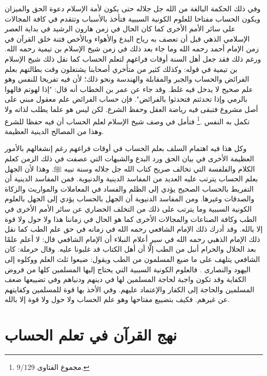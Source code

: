 وفي ذلك الحكمة البالغة من الله جل جلاله حتى يكون لأمة الإسلام دعوة الحق والميزان ويكون الحساب مفتاحا للعلوم الكونية السببية فتأخذ بالأسباب وتتقدم في كافة المجالات على سائر الأمم الأخرى كما كان الحال في زمن هارون الرشيد في بداية العصر الإسلامي الذهي قبل أن تعصف به رياح البدع والأهواء وبالأخص فتنة خلق القرآن في زمن الإمام أحمد رحمه الله وما جاء بعد ذلك في زمن شيخ الإسلام بن تيمية رحمه الله. ورغم ذلك فقد جعل أهل السنة أوقات فراغهم لتعلم الحساب كما نقل ذلك شيخ الإسلام بن تيمية في قوله: وكذلك كثير من متأخري أصحابنا يشتغلون وقت بطالتهم بعلم الفرائض والحساب والجبر والمقابلة والهندسة ونحو ذلك؛ لأن فيه تفريحا للنفس وهو علم صحيح لا يدخل فيه غلط. وقد جاء عن عمر بن الخطاب أنه قال: "إذا لهوتم فالهوا بالرمي وإذا تحدثتم فتحدثوا بالفرائض". فإن حساب الفرائض علم معقول مبني على أصل مشروع فتبقى فيه رياضة العقل وحفظ الشرع. لكن ليس هو علما يطلب لذاته ولا تكمل به النفس \href{https://shamela.ws/book/7289/4394#p1}{\faExternalLink} \cite{ibnTaimia_Majmoo}.\footnote{مجموع الفتاوى 9/129.} فتأمل في وصف شيخ الإسلام لعلم الحساب أن فيه حفظا للشرع وهذا من المصالح الدينية العظيمة.

وكل هذا فيه اهتمام السلف بعلم الحساب في أوقات فراغهم رغم إنشغالهم بالأمور العظيمة الأخرى في بيان الحق ورد البدع والشبهات التي عصفت في ذلك الزمن كعلم الكلام والفلفسة التي تخالف صريح كتاب الله جل جلاله وسنة نبيه ﷺ. وهذا لأن الجهل بعلم الحساب يترتب عليه العديد من المفاسد الدينية والدنيوية. فمن المفاسد الدينية أن التفريط بالحساب الصحيح يؤدي إلى الظلم والفساد في المعاملات والمواريث والزكاة والصدقات وغيرها. ومن المفاسد الدنيوية أن الجهل بالحساب يؤدي إلى الجهل بالعلوم الكونية السببية وما يترتب على ذلك من التخلف الحضاري عن سائر الأمم الأخرى في الطب وكافة الصناعات والمجالات الأخرى كما هو الحال في زماننا هذا ولا حول ولا قوة إلا بالله. وقد أدرك ذلك الإمام الشافعي رحمه الله في زمانه في حق علم الطب كما نقل ذلك الإمام الذهبي رحمه الله في سير أعلام النبلاء أن الإمام الشافعي قال: لا أعلم علمًا بعد الحلال والحرام أنبل من الطب إلَّا أن أهل الكتاب قد غلبونا عليه. وقال حرملة: كان الشافعي يتلهف على ما ضيع المسلمون من الطب ويقول: ضيعوا ثلث العلم ووكلوه إلى اليهود والنصارى \href{https://shamela.ws/book/22669/4486#p7}{\faExternalLink} \cite{dahabi_Siyar}. فالعلوم الكونية السببية التي يحتاج إليها المسلمين كلها من فروض الكفاية وقد تكون واجبة لحاجة المسلمين لها في دينهم ودنياهم وفي تضييعها ضعف المسلمين والحاجة إلى الكفار والإعتماد عليهم. وفي الأخذ بها قوة للمسلمين وكفايتهم عن غيرهم. فكيف بتضييع مفتاحها وهو علم الحساب ولا حول ولا قوة إلا بالله.

\section{نهج القرآن في تعلم الحساب}

